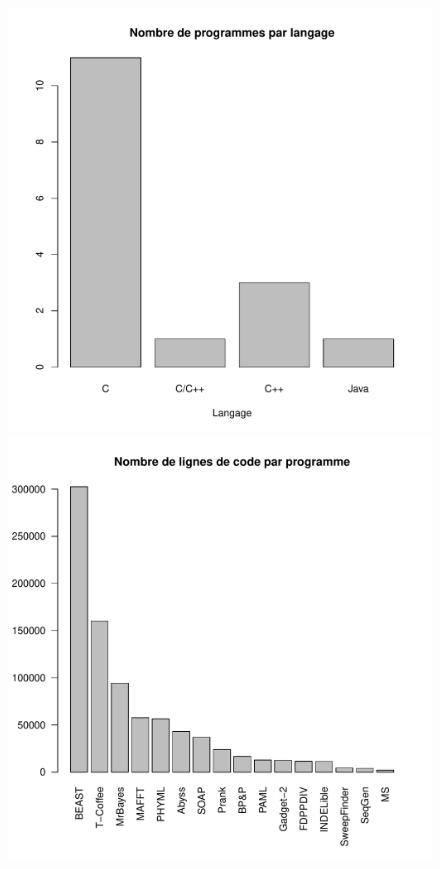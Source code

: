 \begin{figure}[!h]
  \includegraphics[width=\linewidth]{figures/prog_lang.pdf}
  \caption{}\label{fig:prog_lang}
  \endminipage\hfill
  \includegraphics[width=\linewidth]{figures/lin_prog.pdf}
  \caption{}\label{fig:lin_prog}
  \endminipage\hfill
\end{figure}

